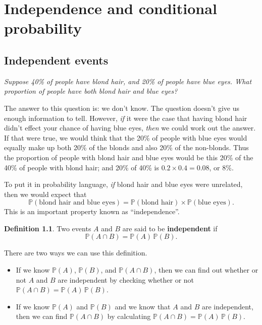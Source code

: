 \documentclass[
  a4paper,
]{book}
\providecommand{\tightlist}{%
  \setlength{\itemsep}{0pt}\setlength{\parskip}{0pt}}
\theoremstyle{definition}
\newtheorem{definition}{Definition}[chapter]
\theoremstyle{definition}
\theoremstyle{definition}
\theoremstyle{definition}
\theoremstyle{remark}
\begin{document}
\hypertarget{L07-conditional}{%
\chapter{Independence and conditional probability}\label{L07-conditional}}

\hypertarget{independent-events}{%
\section{Independent events}\label{independent-events}}

\emph{Suppose 40\% of people have blond hair, and 20\% of people have blue eyes. What proportion of people have both blond hair and blue eyes?}

The answer to this question is: we don't know. The question doesn't give us enough information to tell. However, \emph{if} it were the case that having blond hair didn't effect your chance of having blue eyes, \emph{then} we could work out the answer. If that were true, we would think that the 20\% of people with blue eyes would equally make up both 20\% of the blonds and also 20\% of the non-blonds. Thus the proportion of people with blond hair and blue eyes would be this 20\% of the 40\% of people with blond hair; and 20\% of 40\% is \(0.2 \times 0.4 = 0.08\), or 8\%.

To put it in probability language, \emph{if} blond hair and blue eyes were unrelated, then we would expect that
\[ \mathbb P(\text{blond hair and blue eyes}) = \mathbb P(\text{blond hair}) \times \mathbb P(\text{blue eyes}) . \]
This is an important property known as ``independence''.

\begin{definition}
Two events \(A\) and \(B\) are said to be \textbf{independent} if
\[ \mathbb P(A \cap B) = \mathbb P(A)\, \mathbb P(B) .  \]
\end{definition}

There are two ways we can use this definition.

\begin{itemize}
\tightlist
\item
  If we know \(\mathbb P(A)\), \(\mathbb P(B)\), and \(\mathbb P(A \cap B)\), then we can find out whether or not \(A\) and \(B\) are independent by checking whether or not \(\mathbb P(A \cap B) = \mathbb P(A)\, \mathbb P(B)\).
\item
  If we know \(\mathbb P(A)\) and \(\mathbb P(B)\) and we know that \(A\) and \(B\) are independent, then we can find \(\mathbb P(A \cap B)\) by calculating \(\mathbb P(A \cap B) = \mathbb P(A)\, \mathbb P(B)\).
\end{itemize}
\end{document}
